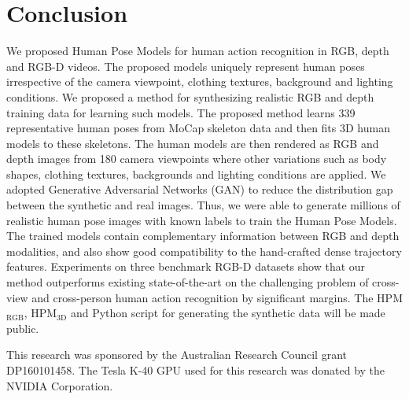 \documentclass[twocolumn]{svjour3}          \smartqed  \usepackage{graphicx}
\begin{document}
\section{Conclusion}
We proposed Human Pose Models for human action recognition in RGB, depth and RGB-D videos. The proposed models uniquely represent human poses irrespective of the camera viewpoint, clothing textures, background and lighting conditions. We proposed a method for synthesizing realistic RGB and depth training data for learning such models. The proposed method learns 339 representative human poses from MoCap skeleton data and then fits 3D human models to these skeletons. The human models are then rendered as RGB and depth images from 180 camera viewpoints where other variations such as body shapes, clothing textures, backgrounds and lighting conditions are applied. We adopted Generative Adversarial Networks (GAN) to reduce the distribution gap between the synthetic and real images. Thus, we were able to generate millions of realistic human pose images with known labels to train the Human Pose Models. The trained models contain complementary information between RGB and depth modalities, and also show good compatibility to the hand-crafted dense trajectory features. Experiments on three benchmark RGB-D datasets show that our method outperforms existing state-of-the-art on the challenging problem of cross-view and cross-person human action recognition by significant margins. The HPM$_{\mathrm{RGB}}$, HPM$_{\mathrm{3D}}$ and Python script for generating the synthetic data will be made public.













\begin{acknowledgements}
This research was sponsored by the Australian Research Council grant DP160101458. The Tesla K-40 GPU used for this research was donated by the NVIDIA Corporation.
\end{acknowledgements}

\balance

         
\end{document}

